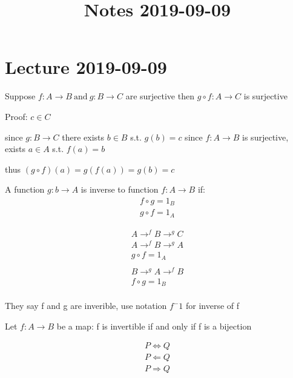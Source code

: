 \documentclass[class=scrartcl, crop=false]{standalone}
\begin{document}
\title{Notes 2019-09-09}

\section{Lecture 2019-09-09}

\begin{theorem}
  

Suppose $f: A \to B \ \text{and} \  g: B \to C$ are surjective then  $g \circ f : A \to C$ is surjective

Proof:
$c \in C $

since $g: B \to C$ there exists $b \in B $ s.t. $g(b) = c$ 
since $f:A \to B $ is surjective, exists $a \in A$ s.t. $f(a) = b$ 

thus $(g\circ f) (a) = g(f(a)) = g(b) = c$

\end{theorem}

\begin{definition}
  
A function $g:b \to A$ is inverse to function $f: A \to B$ if:
\begin{align*}
f \circ g = 1_B \\
g \circ f = 1_A
\end{align*} 
\begin{center}
  
\begin{gather*}
A \to^f B \to^g C\\
A \to^f B \to^g A\\
g \circ f = 1_A\\
\\
B \to^g A \to^f B\\
f \circ g = 1_B\\
\end{gather*}
\end{center}

\end{definition}

\begin{note}
  
They say f and g are inverible, use notation $f^-1$ for inverse of f

\end{note}

\begin{theorem}
Let $f: A \to B $ be a map:
f is invertible if and only if f is a bijection
\end{theorem}

\begin{align*}
P\Leftrightarrow Q \\
P \Leftarrow Q \\
P \Rightarrow Q \\
\end{align*} 
\end{document}
